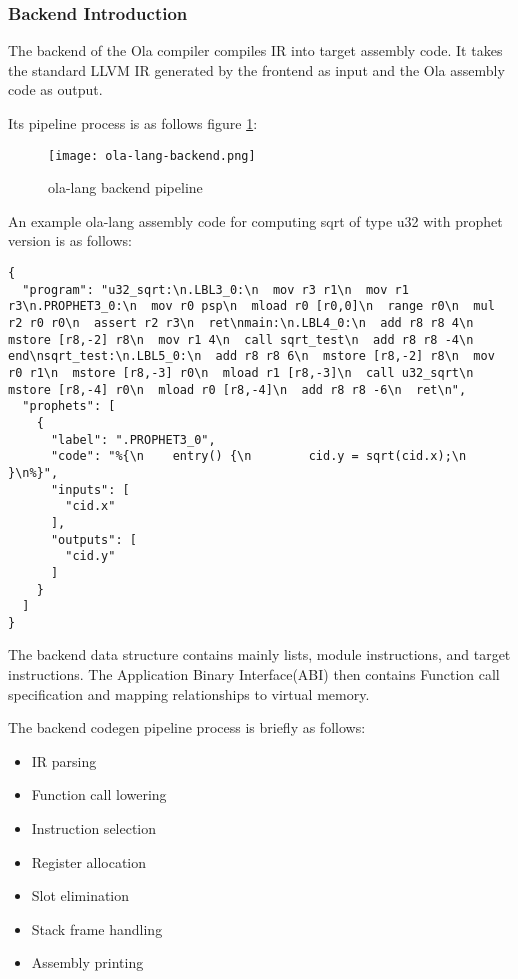 \subsubsection{Backend Introduction}

The backend of the Ola compiler compiles IR into target assembly code. It takes the standard LLVM IR generated by the frontend as input and the Ola assembly code as output.

Its pipeline process is as follows figure \ref{fig:ola-lang-backend}:
\begin{figure}[!htbp]
    \centering
    \texttt{[image: ola-lang-backend.png]}
    \caption{ola-lang backend pipeline}
    \label{fig:ola-lang-backend}
\end{figure}

An example ola-lang assembly code for computing sqrt of type u32 with prophet version is as follows:
\begin{lstlisting}[language={}]
{
  "program": "u32_sqrt:\n.LBL3_0:\n  mov r3 r1\n  mov r1 r3\n.PROPHET3_0:\n  mov r0 psp\n  mload r0 [r0,0]\n  range r0\n  mul r2 r0 r0\n  assert r2 r3\n  ret\nmain:\n.LBL4_0:\n  add r8 r8 4\n  mstore [r8,-2] r8\n  mov r1 4\n  call sqrt_test\n  add r8 r8 -4\n  end\nsqrt_test:\n.LBL5_0:\n  add r8 r8 6\n  mstore [r8,-2] r8\n  mov r0 r1\n  mstore [r8,-3] r0\n  mload r1 [r8,-3]\n  call u32_sqrt\n  mstore [r8,-4] r0\n  mload r0 [r8,-4]\n  add r8 r8 -6\n  ret\n",
  "prophets": [
    {
      "label": ".PROPHET3_0",
      "code": "%{\n    entry() {\n        cid.y = sqrt(cid.x);\n    }\n%}",
      "inputs": [
        "cid.x"
      ],
      "outputs": [
        "cid.y"
      ]
    }
  ]
}
\end{lstlisting}


The backend data structure contains mainly lists, module instructions, and target instructions.
The Application Binary Interface(ABI) then contains Function call specification and mapping relationships to virtual memory.

The backend codegen pipeline process is briefly as follows:
\begin{itemize}
    \item IR parsing

    \item Function call lowering

    \item Instruction selection

    \item Register allocation

    \item Slot elimination

    \item Stack frame handling

    \item Assembly printing
\end{itemize}
